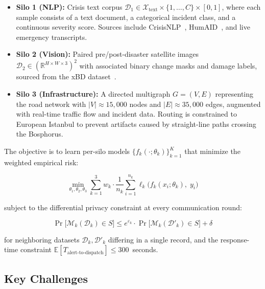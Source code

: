 \documentclass[conference]{IEEEtran}
\begin{document}
\begin{itemize}
    \item \textbf{Silo 1 (NLP):} Crisis text corpus $\mathcal{D}_1 \in \mathcal{X}_{\text{text}} \times \{1, \ldots, C\} \times [0,1]$, where each sample consists of a text document, a categorical incident class, and a continuous severity score. Sources include CrisisNLP~\cite{b5}, HumAID~\cite{b6}, and live emergency transcripts.
    \item \textbf{Silo 2 (Vision):} Paired pre/post-disaster satellite images $\mathcal{D}_2 \in (\mathbb{R}^{H \times W \times 3})^2$ with associated binary change masks and damage labels, sourced from the xBD dataset~\cite{b7}.
    \item \textbf{Silo 3 (Infrastructure):} A directed multigraph $G = (V, E)$ representing the road network with $|V| \approx 15{,}000$ nodes and $|E| \approx 35{,}000$ edges, augmented with real-time traffic flow and incident data. Routing is constrained to European Istanbul to prevent artifacts caused by straight-line paths crossing the Bosphorus.
\end{itemize}

The objective is to learn per-silo models $\{f_k(\cdot; \theta_k)\}_{k=1}^K$ that minimize the weighted empirical risk:

\begin{equation}
\min_{\theta_1, \theta_2, \theta_3} \sum_{k=1}^{3} w_k \cdot \frac{1}{n_k} \sum_{i=1}^{n_k} \ell_k\bigl(f_k(x_i; \theta_k),\; y_i\bigr)
\label{eq:objective}
\end{equation}

\noindent subject to the differential privacy constraint at every communication round:

\begin{equation}
\Pr\bigl[\mathcal{M}_k(\mathcal{D}_k) \in S\bigr] \leq e^{\varepsilon_k} \cdot \Pr\bigl[\mathcal{M}_k(\mathcal{D}'_k) \in S\bigr] + \delta
\label{eq:dp}
\end{equation}

\noindent for neighboring datasets $\mathcal{D}_k, \mathcal{D}'_k$ differing in a single record, and the response-time constraint $\mathbb{E}[T_{\text{alert-to-dispatch}}] \leq 300$~seconds.

\subsection{Key Challenges}
\end{document}
